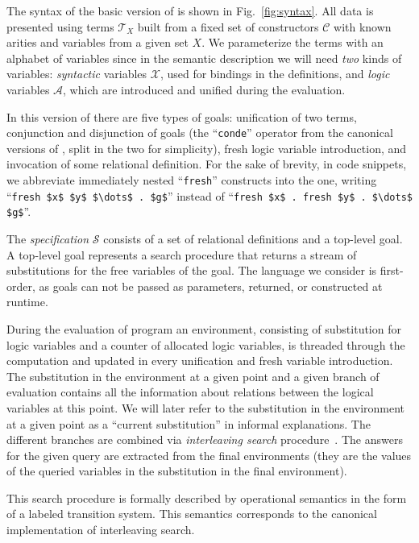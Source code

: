 The syntax of the basic version of \mK is shown in Fig.~\ref{fig:syntax}. 
All data is presented using terms $\mathcal{T}_X$ built from a fixed set of constructors $\mathcal{C}$ with known arities and variables
from a given set $X$.
We parameterize the terms with an alphabet of variables since in the semantic description we will need \emph{two} kinds of variables:
\emph{syntactic} variables $\mathcal{X}$, used for bindings in the definitions, and \emph{logic} variables $\mathcal{A}$, which are
introduced and unified during the evaluation.

In this version of \mK there are five types of goals: unification of two terms, conjunction and disjunction of goals (the
``\lstinline|conde|'' operator from the canonical versions of \mK, split in the two for simplicity), fresh logic variable introduction, and
invocation of some relational definition. For the sake of brevity, in code snippets, we abbreviate immediately nested ``\lstinline|fresh|''
constructs into the one, writing ``\lstinline|fresh $x$ $y$ $\dots$ . $g$|'' instead of
``\lstinline|fresh $x$ . fresh $y$ . $\dots$ $g$|''.

The \emph{specification} $\mathcal{S}$ consists of a set of relational definitions and a top-level goal.
A top-level goal represents a search procedure that returns a stream of substitutions for the free variables of the goal.
The language we consider is first-order, as goals can not be passed as parameters, returned, or constructed at runtime.

During the evaluation of \mK program an environment, consisting of substitution for logic variables and a counter of allocated logic
variables, is threaded through the computation and updated in every unification and fresh variable introduction.
The substitution in the environment at a given point and a given branch of evaluation contains all the information about relations between
the logical variables at this point. We will later refer to the substitution in the environment at a given point as a ``current substitution''
in informal explanations.
The different branches are combined via \emph{interleaving search} procedure~\cite{InterleavingSearch}.
The answers for the given query are extracted from the final environments (they are the values of the queried variables in the substitution
in the final environment).

This search procedure is formally described by operational semantics in the form of a labeled transition system.
This semantics corresponds to the canonical implementation of interleaving search. 

